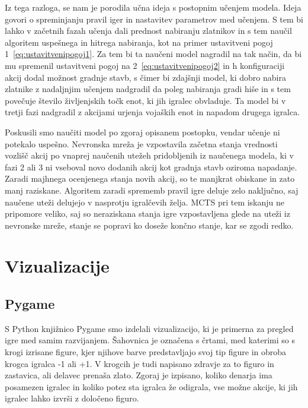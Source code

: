 \documentclass[a4paper, 12pt]{book}
\begin{document}
Iz tega razloga, se nam je porodila učna ideja s postopnim učenjem modela. 
Ideja govori o spreminjanju pravil iger in nastavitev parametrov med učenjem.
S tem bi lahko v začetnih fazah učenja dali prednost nabiranju zlatnikov in s tem naučil algoritem uspešnega in hitrega nabiranja, kot na primer ustavitveni pogoj 1~\ref{eq:ustavitvenipogoj1}.
Za tem bi ta naučeni model nagradil na tak način, da bi mu spremenil ustavitveni pogoj na 2~\ref{eq:ustavitvenipogoj2} in h konfiguraciji akcij dodal možnost gradnje stavb, s čimer bi zdajšnji model, ki dobro nabira zlatnike z nadaljnjim učenjem nadgradil da poleg nabiranja gradi hiše in s tem povečuje število življenjskih točk enot, ki jih igralec obvladuje.
Ta model bi v tretji fazi nadgradil z akcijami urjenja vojaških enot in napadom drugega igralca.

Poskusili smo naučiti model po zgoraj opisanem postopku, vendar učenje ni potekalo uspešno.
Nevronska mreža je vzpostavila začetna stanja vrednosti vozlišč akcij po vnaprej naučenih utežeh pridobljenih iz naučenega modela, ki v fazi 2 ali 3 ni vseboval novo dodanih akcij kot gradnja stavb oziroma napadanje.
Zaradi majhnega ocenjenega stanja novih akcij, so te manjkrat obiskane in zato manj raziskane.
Algoritem zaradi sprememb pravil igre deluje zelo naključno, saj naučene uteži delujejo v nasprotju igralčevih želja.
MCTS pri tem iskanju ne pripomore veliko, saj so neraziskana stanja igre vzpostavljena glede na uteži iz nevronske mreže, stanje se popravi ko doseže končno stanje, kar se zgodi redko.


\chapter{Vizualizacije}
\label{chvizualizacija}

\section{Pygame}
S Python knjižnico Pygame smo izdelali vizualizacijo, ki je primerna za pregled igre med samim razvijanjem. 
Šahovnica je označena s črtami, med katerimi so s krogi izrisane figure, kjer njihove barve predstavljajo svoj tip figure in obroba krogca igralca -1 ali +1.
V krogcih je tudi napisano zdravje za to figuro in zastavica, ali delavec prenaša zlato.
Zgoraj je izpisano, koliko denarja ima posamezen igralec in koliko potez sta igralca že odigrala, vse možne akcije, ki jih igralec lahko izvrši z določeno figuro.
\end{document}
